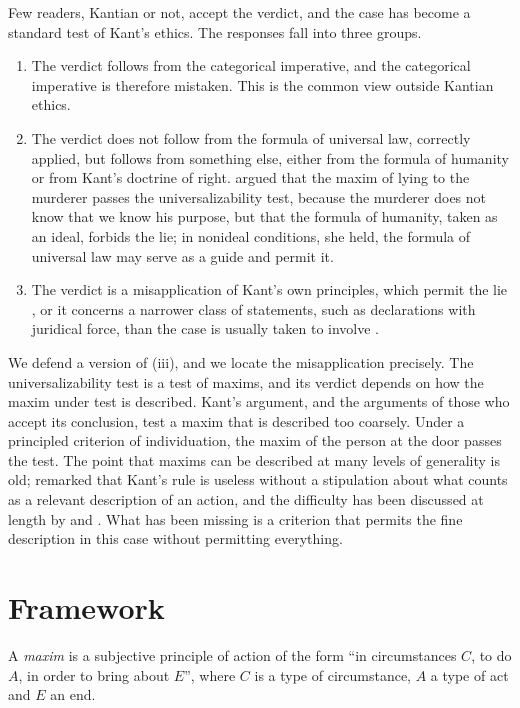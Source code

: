 \documentclass{situationist-preprint}
\begin{document}
Few readers, Kantian or not, accept the verdict, and the case has become a standard test of Kant's ethics. The responses fall into three groups.
\begin{enumerate}[label=(\roman*)]
\item The verdict follows from the categorical imperative, and the categorical imperative is therefore mistaken. This is the common view outside Kantian ethics.
\item The verdict does not follow from the formula of universal law, correctly applied, but follows from something else, either from the formula of humanity or from Kant's doctrine of right. \citet{Korsgaard1986} argued that the maxim of lying to the murderer passes the universalizability test, because the murderer does not know that we know his purpose, but that the formula of humanity, taken as an ideal, forbids the lie; in nonideal conditions, she held, the formula of universal law may serve as a guide and permit it.
\item The verdict is a misapplication of Kant's own principles, which permit the lie \citep{Paton1954}, or it concerns a narrower class of statements, such as declarations with juridical force, than the case is usually taken to involve \citep{Wood2008}.
\end{enumerate}

We defend a version of (iii), and we locate the misapplication precisely. The universalizability test is a test of maxims, and its verdict depends on how the maxim under test is described. Kant's argument, and the arguments of those who accept its conclusion, test a maxim that is described too coarsely. Under a principled criterion of individuation, the maxim of the person at the door passes the test. The point that maxims can be described at many levels of generality is old; \citet{Anscombe1958} remarked that Kant's rule is useless without a stipulation about what counts as a relevant description of an action, and the difficulty has been discussed at length by \citet{ONeill1975} and \citet{Herman1993}. What has been missing is a criterion that permits the fine description in this case without permitting everything.

\section{Framework}

\begin{definition}[Maxim]\label{d:maxim}
A \emph{maxim} is a subjective principle of action of the form \enquote{in circumstances $C$, to do $A$, in order to bring about $E$}, where $C$ is a type of circumstance, $A$ a type of act and $E$ an end.
\end{definition}
\end{document}
